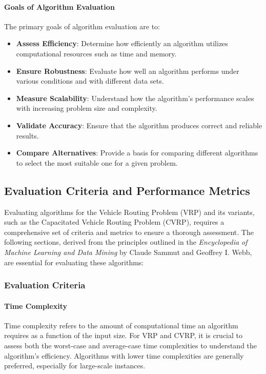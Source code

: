 \documentclass[
]{article}
\begin{document}
    \paragraph{Goals of Algorithm Evaluation}
    The primary goals of algorithm evaluation are to:
    \begin{itemize}
        \item \textbf{Assess Efficiency}: Determine how efficiently an algorithm utilizes computational resources such as time and memory.
        \item \textbf{Ensure Robustness}: Evaluate how well an algorithm performs under various conditions and with different data sets.
        \item \textbf{Measure Scalability}: Understand how the algorithm's performance scales with increasing problem size and complexity.
        \item \textbf{Validate Accuracy}: Ensure that the algorithm produces correct and reliable results.
        \item \textbf{Compare Alternatives}: Provide a basis for comparing different algorithms to select the most suitable one for a given problem.
    \end{itemize}

    \subsection{Evaluation Criteria and Performance Metrics}\label{subsec:evaluation-criteria-and-performance-metrics}

    Evaluating algorithms for the Vehicle Routing Problem (VRP) and its variants, such as the Capacitated Vehicle Routing Problem (CVRP), requires a comprehensive set of criteria and metrics to ensure a thorough assessment. The following sections, derived from the principles outlined in the \textit{Encyclopedia of Machine Learning and Data Mining} by Claude Sammut and Geoffrey I. Webb, are essential for evaluating these algorithms:

    \subsubsection{Evaluation Criteria}
    \label{subsubsec:evaluation_criteria}

    \paragraph{Time Complexity} Time complexity refers to the amount of computational time an algorithm requires as a function of the input size. For VRP and CVRP, it is crucial to assess both the worst-case and average-case time complexities to understand the algorithm’s efficiency. Algorithms with lower time complexities are generally preferred, especially for large-scale instances.
\end{document}
